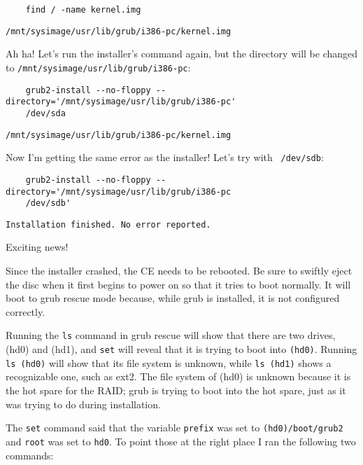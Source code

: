 \documentclass[12pt]{article}
\begin{document}
\begin{tcolorbox}[colback=white, colframe=black]
  \begin{verbatim}
    find / -name kernel.img
  \end{verbatim}
  \tcblower
  {\tt /mnt/sysimage/usr/lib/grub/i386-pc/kernel.img}
\end{tcolorbox}

Ah ha! Let's run the installer's command again, but the directory will be
changed to {\tt /mnt/sysimage/usr/lib/grub/i386-pc}: 

\begin{tcolorbox}[colback=white, colframe=black]
  \begin{verbatim}
    grub2-install --no-floppy --directory='/mnt/sysimage/usr/lib/grub/i386-pc'
    /dev/sda
  \end{verbatim}
  \tcblower
  {\tt /mnt/sysimage/usr/lib/grub/i386-pc/kernel.img}
\end{tcolorbox}

Now I'm getting the same error as the installer! Let's try with {\tt
  /dev/sdb}: 

\begin{tcolorbox}[colback=white, colframe=black]
  \begin{verbatim}
    grub2-install --no-floppy --directory='/mnt/sysimage/usr/lib/grub/i386-pc
    /dev/sdb'
  \end{verbatim}
  \tcblower
  {\tt Installation finished. No error reported.}
\end{tcolorbox}

Exciting news!

\qq Since the installer crashed, the CE needs to be rebooted. Be sure to swiftly
eject the disc when it first begins to power on so that it tries to boot
normally. It will boot to grub rescue mode because, while grub is installed, it
is not configured correctly.

\qq Running the {\tt ls} command in grub rescue will show that there are two
drives, (hd0) and (hd1), and {\tt set} will reveal that it is trying to boot into
{\tt (hd0)}. Running {\tt ls (hd0)} will show that its file system is unknown,
while {\tt ls (hd1)} shows a recognizable one, such as ext2. The file system of
(hd0) is unknown because it is the hot spare for the RAID; grub is trying to
boot into the hot spare, just as it was trying to do during installation.

\qq The {\tt set} command said that the variable {\tt prefix} was set to
{\tt (hd0)/boot/grub2} and {\tt root} was set to {\tt hd0}. To point those at the
right place I ran the following two commands:
\end{document}
